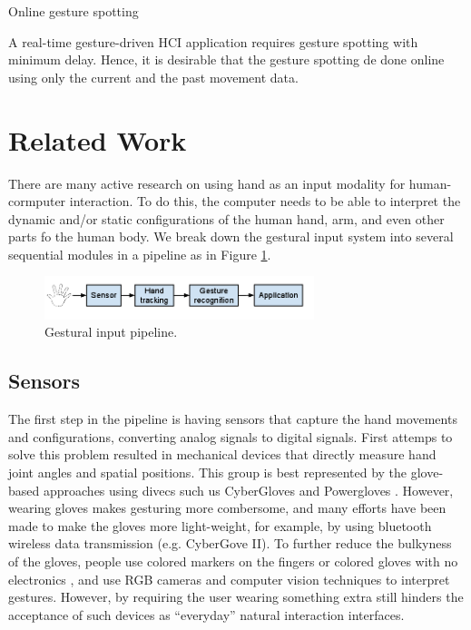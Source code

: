 Online gesture spotting

A real-time gesture-driven HCI application requires gesture spotting with
minimum delay. Hence, it is desirable that the gesture spotting de done online
using only the current and the past movement data.

\section{Related Work}
There are many active research on using hand as an input modality for
human-cormputer interaction. To do this, the computer needs to be able to
interpret the dynamic and/or static configurations of the human hand, arm, and
even other parts fo the human body. We break down the gestural input
system into several sequential modules in a pipeline as in Figure
\ref{fig:pipeline}.

\begin{figure}[h]
  \centering
  \includegraphics[width=0.7\textwidth]{figures/pipeline.png} 
  \caption{Gestural input pipeline.}
  \label{fig:pipeline}
\end{figure}

\subsection{Sensors}
The first step in the pipeline is having sensors that capture the hand movements
and configurations, converting analog signals to digital signals. First attemps
to solve this problem resulted in mechanical devices that directly measure hand
joint angles and spatial positions. This group is best represented by the
glove-based approaches using divecs such us CyberGloves \cite{fels09} and
Powergloves \cite{kadous02}. However, wearing gloves makes gesturing more
combersome, and many efforts have been made to make the gloves more
light-weight, for example, by using bluetooth wireless data transmission (e.g.
CyberGove II). To further reduce the bulkyness of the gloves, people use colored markers on the fingers
\cite{mistry09} or colored gloves with no electronics \cite{Wang09}, and use RGB
cameras and computer vision techniques to interpret gestures. However, by
requiring the user wearing something extra still hinders the acceptance of
such devices as ``everyday'' natural interaction interfaces. 

